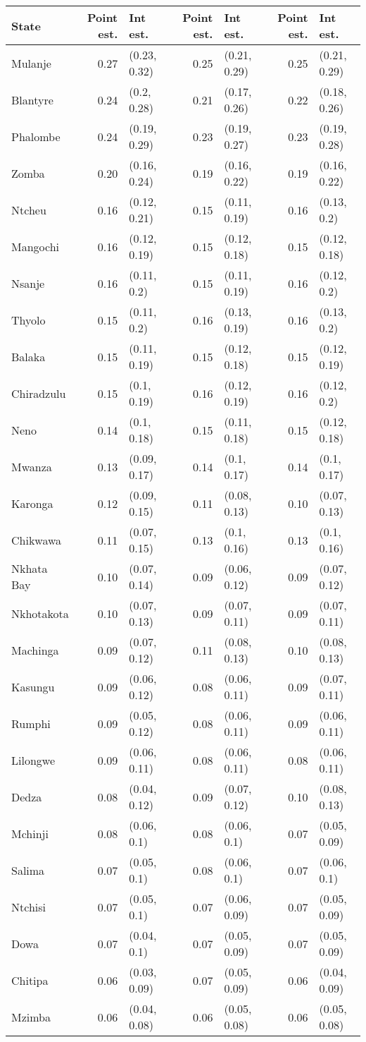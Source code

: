
\begin{tabular}{lrlrlrl}
\toprule
State & Point est. & Int est. & Point est. & Int est. & Point est. & Int est.\\
\midrule
Mulanje & 0.27 & (0.23, 0.32) & 0.25 & (0.21, 0.29) & 0.25 & (0.21, 0.29)\\
Blantyre & 0.24 & (0.2, 0.28) & 0.21 & (0.17, 0.26) & 0.22 & (0.18, 0.26)\\
Phalombe & 0.24 & (0.19, 0.29) & 0.23 & (0.19, 0.27) & 0.23 & (0.19, 0.28)\\
Zomba & 0.20 & (0.16, 0.24) & 0.19 & (0.16, 0.22) & 0.19 & (0.16, 0.22)\\
Ntcheu & 0.16 & (0.12, 0.21) & 0.15 & (0.11, 0.19) & 0.16 & (0.13, 0.2)\\
Mangochi & 0.16 & (0.12, 0.19) & 0.15 & (0.12, 0.18) & 0.15 & (0.12, 0.18)\\
Nsanje & 0.16 & (0.11, 0.2) & 0.15 & (0.11, 0.19) & 0.16 & (0.12, 0.2)\\
Thyolo & 0.15 & (0.11, 0.2) & 0.16 & (0.13, 0.19) & 0.16 & (0.13, 0.2)\\
Balaka & 0.15 & (0.11, 0.19) & 0.15 & (0.12, 0.18) & 0.15 & (0.12, 0.19)\\
Chiradzulu & 0.15 & (0.1, 0.19) & 0.16 & (0.12, 0.19) & 0.16 & (0.12, 0.2)\\
Neno & 0.14 & (0.1, 0.18) & 0.15 & (0.11, 0.18) & 0.15 & (0.12, 0.18)\\
Mwanza & 0.13 & (0.09, 0.17) & 0.14 & (0.1, 0.17) & 0.14 & (0.1, 0.17)\\
Karonga & 0.12 & (0.09, 0.15) & 0.11 & (0.08, 0.13) & 0.10 & (0.07, 0.13)\\
Chikwawa & 0.11 & (0.07, 0.15) & 0.13 & (0.1, 0.16) & 0.13 & (0.1, 0.16)\\
Nkhata Bay & 0.10 & (0.07, 0.14) & 0.09 & (0.06, 0.12) & 0.09 & (0.07, 0.12)\\
Nkhotakota & 0.10 & (0.07, 0.13) & 0.09 & (0.07, 0.11) & 0.09 & (0.07, 0.11)\\
Machinga & 0.09 & (0.07, 0.12) & 0.11 & (0.08, 0.13) & 0.10 & (0.08, 0.13)\\
Kasungu & 0.09 & (0.06, 0.12) & 0.08 & (0.06, 0.11) & 0.09 & (0.07, 0.11)\\
Rumphi & 0.09 & (0.05, 0.12) & 0.08 & (0.06, 0.11) & 0.09 & (0.06, 0.11)\\
Lilongwe & 0.09 & (0.06, 0.11) & 0.08 & (0.06, 0.11) & 0.08 & (0.06, 0.11)\\
Dedza & 0.08 & (0.04, 0.12) & 0.09 & (0.07, 0.12) & 0.10 & (0.08, 0.13)\\
Mchinji & 0.08 & (0.06, 0.1) & 0.08 & (0.06, 0.1) & 0.07 & (0.05, 0.09)\\
Salima & 0.07 & (0.05, 0.1) & 0.08 & (0.06, 0.1) & 0.07 & (0.06, 0.1)\\
Ntchisi & 0.07 & (0.05, 0.1) & 0.07 & (0.06, 0.09) & 0.07 & (0.05, 0.09)\\
Dowa & 0.07 & (0.04, 0.1) & 0.07 & (0.05, 0.09) & 0.07 & (0.05, 0.09)\\
Chitipa & 0.06 & (0.03, 0.09) & 0.07 & (0.05, 0.09) & 0.06 & (0.04, 0.09)\\
Mzimba & 0.06 & (0.04, 0.08) & 0.06 & (0.05, 0.08) & 0.06 & (0.05, 0.08)\\
\bottomrule
\end{tabular}
